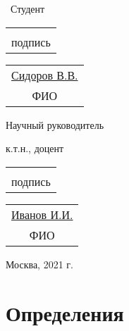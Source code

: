 \documentclass[a4paper,12pt, landscape]{report}
\begin{document}
\begin{multicols}{2}
\begin{flushleft}
~Студент\par\:\par
\begin{tabular}{c}
\underline{\hspace{8em}} \vspace{-2mm}\\
{\tiny {\color{graylight}подпись}}
\end{tabular}
\begin{tabular}{c}
\underline{\hspace{2em}Сидоров В.В.\hspace{1em}}\\
{\tiny{\color{graylight} ФИО}}
\end{tabular}
\end{flushleft}

\begin{flushright}
Научный руководитель

к.т.н., доцент
\end{flushright}

\begin{tabular}{c}
\underline{\hspace{8em}} \vspace{-1mm}\\
{\tiny {\color{graylight}подпись}}
\end{tabular}
\begin{tabular}{c}
\underline{\hspace{2em}Иванов И.И.\hspace{1em}} \vspace{-1mm}\\
{\tiny{\color{graylight} ФИО}}
\end{tabular}
\end{multicols}

\vfill
\begin{center}Москва, 2021 г.\end{center}
\newpage
\tableofcontents %

\setcounter{page}{2}
\renewcommand{\thepage}{строка номер \Asbuk{page}}

\chapter{Определения}\label{chapter::def}
\end{document}
